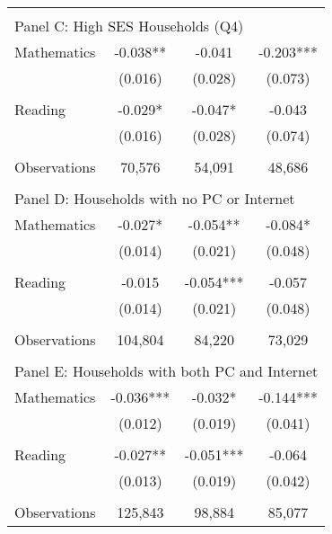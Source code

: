 {\begin{tabular}{lccc}
&  &  &   \\
\multicolumn{4}{l}{Panel C: High SES Households (Q4)} \\
\hspace{3mm}Mathematics&      -0.038** &      -0.041   &      -0.203***\\
                    &     (0.016)   &     (0.028)   &     (0.073)   \\
 
&  &  &   \\
\hspace{3mm}Reading &      -0.029*  &      -0.047*  &      -0.043   \\
                    &     (0.016)   &     (0.028)   &     (0.074)   \\
                    &               &               &               \\
\hspace{3mm}Observations&      70,576   &      54,091   &      48,686   \\
 
&  &  &   \\
\multicolumn{4}{l}{Panel D: Households with no PC or Internet} \\
\hspace{3mm}Mathematics&      -0.027*  &      -0.054** &      -0.084*  \\
                    &     (0.014)   &     (0.021)   &     (0.048)   \\
 
&  &  &   \\
\hspace{3mm}Reading &      -0.015   &      -0.054***&      -0.057   \\
                    &     (0.014)   &     (0.021)   &     (0.048)   \\
                    &               &               &               \\
\hspace{3mm}Observations&     104,804   &      84,220   &      73,029   \\
 
&  &  &   \\
\multicolumn{4}{l}{Panel E: Households with both PC and Internet} \\
\hspace{3mm}Mathematics&      -0.036***&      -0.032*  &      -0.144***\\
                    &     (0.012)   &     (0.019)   &     (0.041)   \\
 
&  &  &   \\
\hspace{3mm}Reading &      -0.027** &      -0.051***&      -0.064   \\
                    &     (0.013)   &     (0.019)   &     (0.042)   \\
                    &               &               &               \\
\hspace{3mm}Observations&     125,843   &      98,884   &      85,077   \\
 

\bottomrule
\end{tabular}
}
